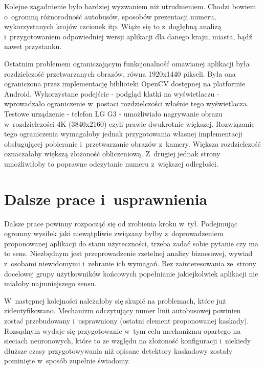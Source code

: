Kolejne zagadnienie było bardziej wyzwaniem niż utrudnieniem. Chodzi
bowiem o~ogromną różnorodność autobusów, sposobów prezentacji numeru,
wykorzystanych krojów czcionek itp. Wiąże się to z~dogłębną analizą
i~przygotowaniem odpowiedniej wersji aplikacji dla danego kraju,
miasta, bądź nawet przystanku.

Ostatnim problemem ograniczającym funkcjonalność omawianej 
aplikacji była rozdzielczość przetwarzanych
obrazów, równa 1920x1440 pikseli.
Była ona ograniczona przez implementację biblioteki OpenCV dostępnej
na platformie Android. Wykorzystane podejście - podgląd klatki 
na wyświetlaczu - wprowadzało ograniczenie w~postaci rozdzielczości
właśnie tego wyświetlacza. Testowe urządzenie - telefon LG G3 - 
umożliwiało nagrywanie obrazu w~rozdzielczości 4K (3840x2160) czyli
prawie dwukrotnie większej. Rozwiązanie tego ograniczenia wymagałoby jednak przygotowania
własnej implementacji obsługującej pobieranie i~przetwarzanie 
obrazów z~kamery. Większa rozdzielczość oznaczałaby większą 
złożoność obliczeniową. Z~drugiej jednak strony umożliwiłoby to
poprawne odczytanie numeru z~większej odległości.

\section{Dalsze prace i~usprawnienia}

Dalsze prace powinny rozpocząć się od zrobienia kroku w~tył.
Podejmując ogromny wysiłek jaki niewątpliwie związany byłby z~doprowadzeniem 
proponowanej aplikacji do stanu użyteczności, trzeba zadać sobie pytanie
czy ma to sens. Niezbędnym jest przeprowadzenie rzetelnej analizy
biznesowej, wywiad z~osobami niewidomymi i~zebranie ich wymagań.
Bez zainteresowania ze~strony docelowej grupy użytkowników końcowych
popełnianie jakiejkolwiek aplikacji nie miałoby najmniejszego sensu.

W~następnej kolejności należałoby się skupić na problemach, które już zidentyfikowano.
Mechanizm odczytujący numer 
linii autobusowej powinien zostać przebudowany i~usprawniony (ostatni element proponowanej kaskady).
Rozsądnym wydaje się przygotowanie w~tym celu mechanizmu opartego na sieciach
neuronowych, które to ze względu na złożoność konfiguracji i~niekiedy
dłuższe czasy przygotowywania niż opisane detektory kaskadowy zostały
pominięte w~sposób zupełnie świadomy.

